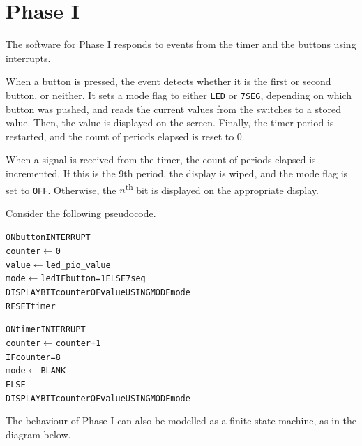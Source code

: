 \documentclass[12pt]{article}
\begin{document}
\doublespacing

\section{Phase I}
The software for Phase I responds to events from the timer and the buttons
using interrupts.

When a button is pressed, the event detects whether it is the first or second
button, or neither.
It sets a mode flag to either \texttt{LED} or \texttt{7SEG}, depending on which
button was pushed, and reads the current values from the switches to a stored
value.
Then, the value is displayed on the screen.
Finally, the timer period is restarted, and the count of periods elapsed is
reset to 0.

When a signal is received from the timer, the count of periods elapsed is incremented.
If this is the 9th period, the display is wiped, and the mode flag is set to \texttt{OFF}.
Otherwise, the $n$\textsuperscript{th} bit is displayed on the appropriate display.

Consider the following pseudocode.

\begin{alltt}
ON button INTERRUPT
    counter \(\gets\) 0
    value \(\gets\) led_pio_value
    mode \(\gets\) led IF button = 1 ELSE 7seg
    DISPLAY BIT counter OF value USING MODE mode
    RESET timer

ON timer INTERRUPT
    counter \(\gets\) counter + 1
    IF counter = 8
        mode \(\gets\) BLANK
    ELSE
        DISPLAY BIT counter OF value USING MODE mode
\end{alltt}

The behaviour of Phase I can also be modelled as a finite state machine, as in the
diagram below.

\end{document}
